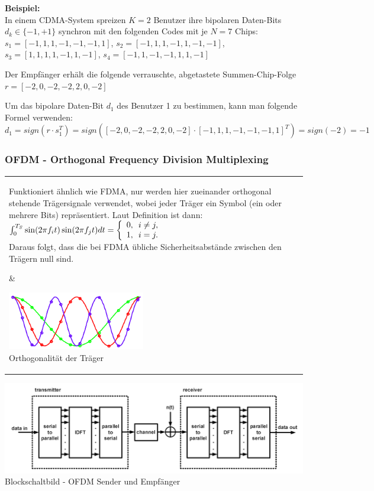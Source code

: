 \textbf{Beispiel:} \\
In einem CDMA-System spreizen $K=2$ Benutzer ihre bipolaren Daten-Bits $d_k \in \{-1,+1\}$ 
synchron mit den folgenden Codes mit je $N=7$ Chips: \\
$s_1=[ -1, 1, 1, -1, -1, -1, 1 ]$, 
$s_2=[ -1, 1, 1, -1, 1, -1, -1 ]$, 
$s_3=[ 1, 1, 1, 1, -1, 1, -1 ]$, 
$s_4=[ -1, 1, -1, -1, 1, 1, -1 ]$

Der Empfänger erhält die folgende verrauschte, abgetastete Summen-Chip-Folge \\
$r=[-2, 0, -2, -2, 2, 0, -2]$ 

Um das bipolare Daten-Bit $d_1$ des Benutzer 1 zu bestimmen, kann man folgende
Formel verwenden: \\
$d_1 = sign(r\cdot s_1^T) = sign([-2, 0, -2, -2, 2, 0, -2]\cdot [ -1, 1, 1, -1, -1, -1, 1 ]^T)=sign(-2)=-1$


\subsubsection{OFDM - Orthogonal Frequency Division Multiplexing
}

\begin{tabular}{ll}
\parbox{12cm}{
Funktioniert ähnlich wie FDMA, nur werden hier zueinander orthogonal stehende
Trägersignale verwendet, wobei jeder Träger ein Symbol (ein oder mehrere Bits)
repräsentiert. Laut Definition ist dann: \\
$  \int_0^{T_S} \sin (2\pi f_i t)\sin (2\pi f_j t) dt = 
  \left\{\begin{array}{l@{\,\,\,\,} l}
         0 , &   i\not = j, \\ 
         1 , &   i = j .   \end{array} \right.$\\
Daraus folgt, dass die bei FDMA übliche Sicherheitsabstände zwischen den Trägern
null sind. 
       } 
&
\parbox{6cm}{
    \includegraphics[width=6cm]{./bilder/modulation_OFDM-orthogonal.png}\\
    \small Orthogonalität der Träger
}       
\end{tabular}
\begin{center}
    \includegraphics[width=15cm]{./bilder/modulation_OFDM-schematic.png}\\
    \small Blockschaltbild - OFDM Sender und Empfänger
\end{center}

